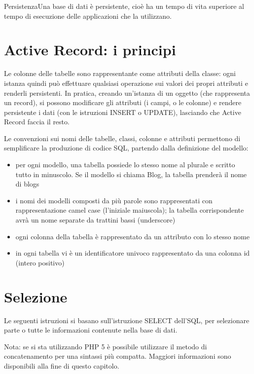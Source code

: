 \begin{deftabv}{Persistenza}{Una base di dati è persistente, cioè ha un tempo di vita superiore al tempo di esecuzione delle applicazioni che la utilizzano.}
\end{deftabv}
\normalsize

\section*{Active Record: i principi}
Le colonne delle tabelle sono rappresentante come attributi della classe: ogni istanza quindi può effettuare qualsiasi operazione sui valori dei propri attributi e renderli persistenti. In pratica, creando un'istanza di un oggetto (che rappresenta un record), si possono modificare gli attributi (i campi, o le colonne) e rendere persistente i dati (con le istruzioni INSERT o UPDATE), lasciando che Active Record faccia il resto.

Le convenzioni sui nomi delle tabelle, classi, colonne e attributi permettono di semplificare la produzione di codice SQL, partendo dalla definizione del modello:

\begin{itemize}
\item per ogni modello, una tabella possiede lo stesso nome al plurale e scritto tutto in minuscolo. Se il modello si chiama Blog, la tabella prenderà il nome di blogs
\item i nomi dei modelli composti da più parole sono rappresentati con rappresentazione camel case (l'iniziale maiuscola); la tabella corrispondente avrà un nome separate da trattini bassi (underscore)
\item ogni colonna della tabella è rappresentato da un attributo con lo stesso nome
\item in ogni tabella vi è un identificatore univoco rappresentato da una colonna id (intero positivo)
\end{itemize}

\section*{Selezione}
Le seguenti istruzioni si basano sull'istruzione SELECT dell'SQL, per selezionare parte o tutte le informazioni contenute nella base di dati.

Nota: se si sta utilizzando PHP 5 è possibile utilizzare il metodo di concatenamento per una sintassi più compatta. Maggiori informazioni sono disponibili alla fine di questo capitolo.

